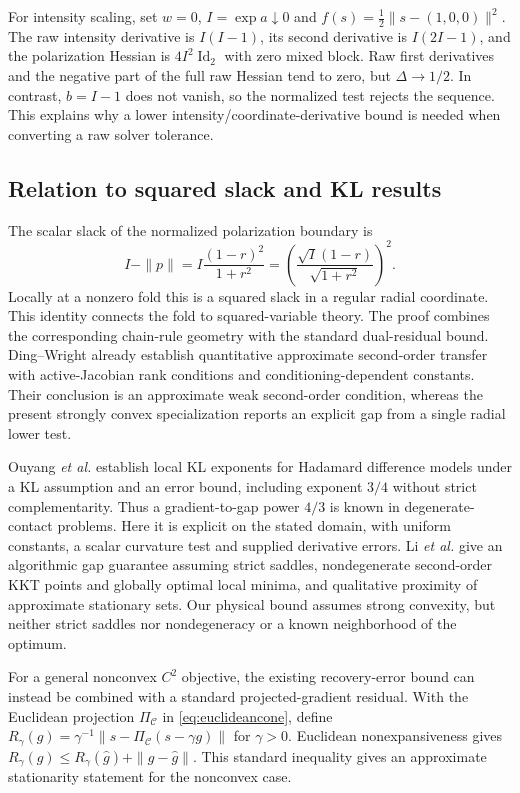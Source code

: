 \documentclass[10pt,a4paper]{article}
\begin{document}
For intensity scaling, set $w=0$, $I=\exp a\downarrow0$ and $f(s)=\tfrac12\|s-(1,0,0)\|^2$. The raw intensity derivative is $I(I-1)$, its second derivative is $I(2I-1)$, and the polarization Hessian is $4I^2\operatorname{Id}_2$ with zero mixed block. Raw first derivatives and the negative part of the full raw Hessian tend to zero, but $\Delta\to1/2$. In contrast, $b=I-1$ does not vanish, so the normalized test rejects the sequence. This explains why a lower intensity/coordinate-derivative bound is needed when converting a raw solver tolerance.

\subsection{Relation to squared slack and KL results}
The scalar slack of the normalized polarization boundary is
\begin{equation}
 I-\|p\|=I\frac{(1-r)^2}{1+r^2}
       =\left(\frac{\sqrt I(1-r)}{\sqrt{1+r^2}}\right)^2.
 \label{eq:sstopslacklink}
\end{equation}
Locally at a nonzero fold this is a squared slack in a regular radial coordinate. This identity connects the fold to squared-variable theory. The proof combines the corresponding chain-rule geometry with the standard dual-residual bound. Ding--Wright \cite[Thm.~3.6, Cor.~3.7]{supp-dingwright} already establish quantitative approximate second-order transfer with active-Jacobian rank conditions and conditioning-dependent constants. Their conclusion is an approximate weak second-order condition, whereas the present strongly convex specialization reports an explicit gap from a single radial lower test.

Ouyang \emph{et al.} \cite[Thm.~3.11, Rem.~3.12]{supp-ouyang} establish local KL exponents for Hadamard difference models under a KL assumption and an error bound, including exponent $3/4$ without strict complementarity. Thus a gradient-to-gap power $4/3$ is known in degenerate-contact problems. Here it is explicit on the stated domain, with uniform constants, a scalar curvature test and supplied derivative errors. Li \emph{et al.} \cite[Thm.~5, Lem.~6.1]{supp-hadamard} give an algorithmic gap guarantee assuming strict saddles, nondegenerate second-order KKT points and globally optimal local minima, and qualitative proximity of approximate stationary sets. Our physical bound assumes strong convexity, but neither strict saddles nor nondegeneracy or a known neighborhood of the optimum.

For a general nonconvex $C^2$ objective, the existing recovery-error bound can instead be combined with a standard projected-gradient residual. With the Euclidean projection $\Pi_{\mathcal C}$ in \eqref{eq:euclideancone}, define $R_\gamma(g)=\gamma^{-1}\|s-\Pi_{\mathcal C}(s-\gamma g)\|$ for $\gamma>0$. Euclidean nonexpansiveness gives $R_\gamma(g)\le R_\gamma(\widehat g)+\|g-\widehat g\|$. This standard inequality gives an approximate stationarity statement for the nonconvex case.
\end{document}
